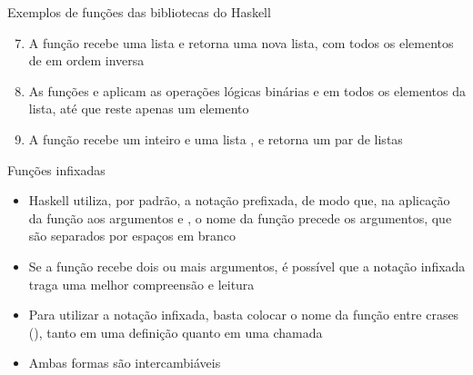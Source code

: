 \begin{frame}[fragile]{Exemplos de funções das bibliotecas do Haskell}

    \begin{enumerate}
        \setcounter{enumi}{6}

        \item A função  recebe uma lista  e retorna uma 
            nova lista, com todos os elementos de  em ordem inversa


        \item As funções  e  aplicam as operações lógicas
            binárias  e  em todos os elementos da lista,
            até que reste apenas um elemento


        \item A função  recebe um inteiro  e uma lista
            , e retorna um par de listas 
    \end{enumerate}

\end{frame}
\begin{frame}[fragile]{Funções infixadas}

    \begin{itemize}
        \item Haskell utiliza, por padrão, a notação prefixada, de modo que, na aplicação da função
             aos argumentos  e , o nome da
            função precede os argumentos, que são separados por espaços em branco


        \item Se a função recebe dois ou mais argumentos, é possível que a notação infixada traga
            uma melhor compreensão e leitura

        \item Para utilizar a notação infixada, basta colocar o nome da função entre crases
            (), tanto em uma definição quanto em uma chamada

        \item Ambas formas são intercambiáveis

    \end{itemize}

\end{frame}

